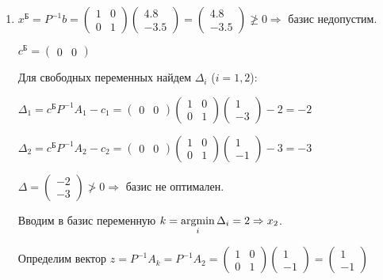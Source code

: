 \begin{enumerate}

\item
$x^\text{Б} = P^{-1}b =
\begin{pmatrix}
	1 & 0 \\
	0 & 1 
\end{pmatrix}
\begin{pmatrix}
	4.8 \\
	-3.5
\end{pmatrix} =
\begin{pmatrix}
	4.8 \\
	-3.5
\end{pmatrix} \ngeq 0
\Rightarrow$ базис недопустим.

$c^\text{Б} = 
\begin{pmatrix}
	0 & 0
\end{pmatrix}$

Для свободных переменных найдем $\Delta_i$ ($i = 1, 2$):

$\Delta_1 = c^\text{Б} P^{-1} A_1 - c_1 =
\begin{pmatrix}
	0 & 0
\end{pmatrix}
\begin{pmatrix}
	1 & 0 \\
	0 & 1 
\end{pmatrix}
\begin{pmatrix}
	1 \\
	-3
\end{pmatrix} - 2 = -2$

$\Delta_2 = c^\text{Б} P^{-1} A_2 - c_2 =
\begin{pmatrix}
	0 & 0
\end{pmatrix}
\begin{pmatrix}
	1 & 0 \\
	0 & 1 
\end{pmatrix}
\begin{pmatrix}
	1 \\
	-1
\end{pmatrix} - 3 = -3$

$\Delta = 
\begin{pmatrix}
	-2 \\
	-3
\end{pmatrix} \ngtr 0 \Rightarrow$ базис не оптимален. 

Вводим в базис переменную $k = \operatorname*{argmin}\limits_i\Delta_i = 2 \Rightarrow x_2$.

Определим вектор $z = P^{-1} A_k = P^{-1} A_2 = 
\begin{pmatrix}
	1 & 0 \\
	0 & 1 
\end{pmatrix}
\begin{pmatrix}
	1 \\
	-1
\end{pmatrix} =
\begin{pmatrix}
	1 \\
	-1
\end{pmatrix}$


\end{enumerate}
